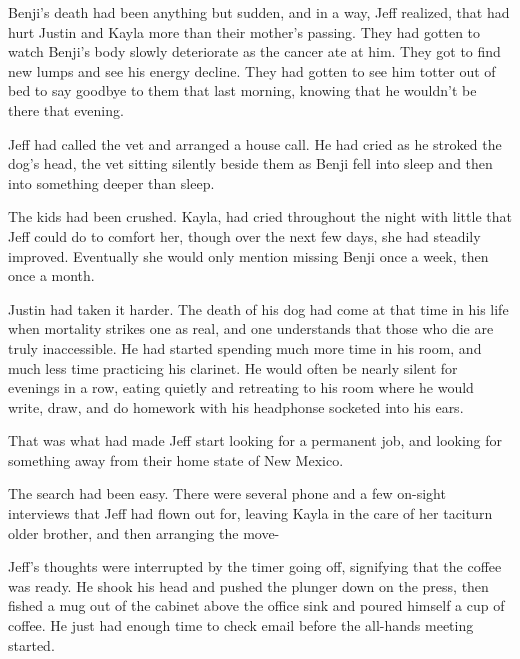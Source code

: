 Benji's death had been anything but sudden, and in a way, Jeff realized, that had hurt Justin and Kayla more than their mother's passing.  They had gotten to watch Benji's body slowly deteriorate as the cancer ate at him.  They got to find new lumps and see his energy decline.  They had gotten to see him totter out of bed to say goodbye to them that last morning, knowing that he wouldn't be there that evening.

Jeff had called the vet and arranged a house call.  He had cried as he stroked the dog's head, the vet sitting silently beside them as Benji fell into sleep and then into something deeper than sleep.

The kids had been crushed.  Kayla, had cried throughout the night with little that Jeff could do to comfort her, though over the next few days, she had steadily improved.  Eventually she would only mention missing Benji once a week, then once a month.

Justin had taken it harder.  The death of his dog had come at that time in his life when mortality strikes one as real, and one understands that those who die are truly inaccessible.  He had started spending much more time in his room, and much less time practicing his clarinet.  He would often be nearly silent for evenings in a row, eating quietly and retreating to his room where he would write, draw, and do homework with his headphonse socketed into his ears.

That was what had made Jeff start looking for a permanent job, and looking for something away from their home state of New Mexico.

The search had been easy.  There were several phone and a few on-sight interviews that Jeff had flown out for, leaving Kayla in the care of her taciturn older brother, and then arranging the move-

Jeff's thoughts were interrupted by the timer going off, signifying that the coffee was ready.  He shook his head and pushed the plunger down on the press, then fished a mug out of the cabinet above the office sink and poured himself a cup of coffee.  He just had enough time to check email before the all-hands meeting started.
